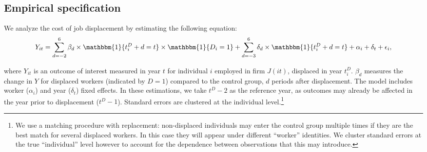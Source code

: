 


\subsection{Empirical specification}\label{sec:empirical}

We analyze the cost of job displacement by estimating the following equation:
\begin{equation}\label{eq:main_estimating_equation}
Y_{it} = \sum\limits_{d=-2}^{6} \beta_{d} \times {\mathbbm{1}}\{t^D_i+d=t\} \times \mathbbm{1}\{D_i=1\} + \sum\limits_{d=-3}^{6} \delta_{d} \times {\mathbbm{1}}\{t^D_i+d=t\} + \alpha_i + \delta_t + \epsilon_i,
\end{equation}

where $Y_{it}$ is an outcome of interest measured in year $t$ for individual $i$ employed in firm $J(it)$, displaced in year $t^D_i$. $\beta_{d}$ measures the change in $Y$ for displaced workers (indicated by $D=1$) compared to the control group, $d$ periods after displacement. The model includes worker ($\alpha_i$) and year ($\delta_t$) fixed effects. In these estimations, we take $t^D-2$ as the reference year, as outcomes may already be affected in the year prior to displacement ($t^D-1$). Standard errors are clustered at the individual level.\footnote{We use a matching procedure with replacement: non-displaced individuals may enter the control group multiple times if they are the best match for several displaced workers. In this case they will appear under different ``worker'' identities. We cluster standard errors at the true ``individual'' level however to account for the dependence between observations that this may introduce. }

